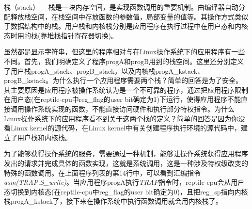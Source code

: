 \begin{note} 
栈（stack）— 栈是一块内存空间，是实现函数调用的重要机制。由编译器自动分配释放栈空间，在栈空间中存放函数的参数值，局部变量的值等。其操作方式类似于数据结构中的栈。用户栈和内核栈分别是应用程序在执行过程中在用户态和内核态时用的栈(靠堆栈指针寄存器切换)。
\end{note} 

虽然都是显示字符串，但这里的程序相对与在Linux操作系统下的应用程序有一些不同。首先，我们明确定义了程序progA和progB用到的栈空间。这里还分别定义了用户栈progA\_stack、progB\_stack，以及内核栈progA\_kstack、progB\_kstack。为什么执行一个应用程序需要两个栈？简单的回答是为了安全。其主要原因是应用程序被操作系统认为是一个不可靠的程序，通过把应用程序限制在用户态(在reptile-cpu中reg\_flag的user bit确定为1)下运行，使得应用程序不能直接调用操作系统实现的函数，不能直接访问硬件和执行部分特权指令。为什么Linux操作系统下的应用程序看不到关于这两个栈的定义？简单的回答是因为你没看Linux kernel的源代码，在Linux kernel中有关创建程序执行环境的源代码中，建立了用户栈和内核栈。

为了能够获得操作系统的服务，需要通过一种机制，能够让操作系统获得应用程序发出的请求并完成具体的函数实现，这就是系统调用，这是一种涉及特权级改变的特殊的函数调用。在上面程序列表的第14行中，可以看到汇编指令\textit{asm(TRAP,S\_write)}。当应用程序progA执行\textit{TRAP}指令时，reptile-cpu会从用户态切换到内核态(在reptile-cpu中reg\_flag的user bit确定为0)，且把reg\_sp指向内核栈progA\_kstack了，接下来在操作系统中执行函数调用就会用内核栈了。

